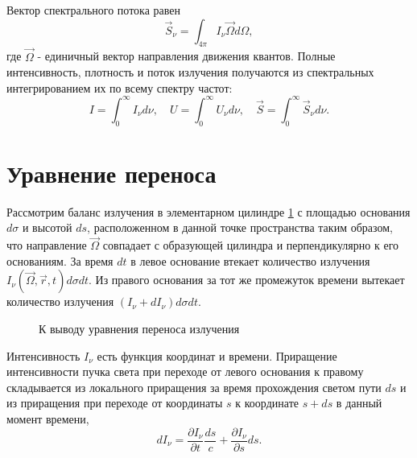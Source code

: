 Вектор спектрального потока равен 
\begin {equation}
\vec S_{\nu} = \int_{4\pi} I_{\nu}\vec\Omega d\Omega,
\end {equation}
где $\vec\Omega$ - единичный вектор направления движения квантов. 
Полные интенсивность, плотность и поток излучения получаются из спектральных интегрированием их по всему спектру частот:
\begin {equation}
I = \int_0^\infty I_{\nu} d\nu, \quad U = \int_0^\infty U_{\nu}d\nu, \quad \vec S =  \int_0^\infty \vec S_{\nu}d\nu.
\end {equation}
\section{Уравнение переноса}
Рассмотрим баланс излучения в элементарном цилиндре \ref{fig:1} с площадью основания $d\sigma$ и высотой $ds$, расположенном в данной точке пространства таким образом, что направление $\vec\Omega$ совпадает с образующей цилиндра и перпендикулярно к его основаниям. За время $dt$ в левое основание втекает количество излучения $I_{\nu} (\vec\Omega, \vec r,t)d\sigma dt$. Из правого основания за тот же промежуток времени вытекает количество излучения $(I_{\nu} + dI_{\nu})d \sigma dt$.

\begin{figure}[ht!]
\caption{К выводу уравнения переноса излучения}
\label{fig:1}
\end{figure}

Интенсивность $I_{\nu}$ есть функция координат и времени. Приращение интенсивности пучка света при переходе от левого основания к правому складывается из локального приращения за время прохождения светом пути $ds$ и из приращения при переходе от координаты $s$ к координате $s+ds$ в данный момент времени, 
\begin {equation}
dI_{\nu}  = \frac{\partial I_{\nu}}{\partial t } \frac{ds}{c}+\frac{\partial I_{\nu}}{\partial s}ds.
\end {equation}

